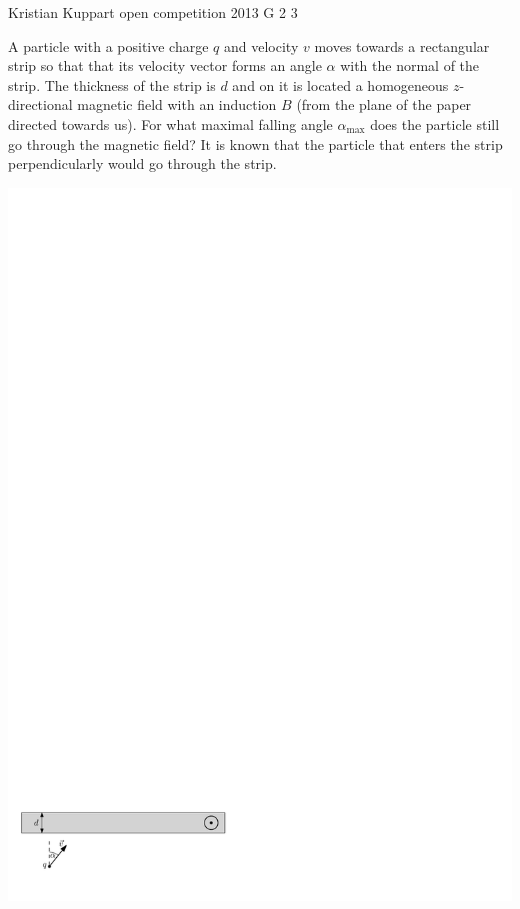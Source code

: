 \documentclass[11pt]{article}
\begin{document}
{Kristian Kuppart} %
{open competition} %
{2013} %
{G 2} %
{3} %
{

\ifEngStatement
A particle with a positive charge $q$ and velocity $v$ moves towards a rectangular strip so that that its velocity vector forms an angle $\alpha$ with the normal of the strip. The thickness of the strip is $d$ and on it is located a homogeneous $z$-directional magnetic field with an induction $B$ (from the plane of the paper directed towards us). For what maximal falling angle $\alpha_{\mathrm{max}}$ does the particle still go through the magnetic field? It is known that the particle that enters the strip perpendicularly would go through the strip.
\begin{center}
\includegraphics[width=\linewidth]{2013-lahg-02-magnetpeegeljoonis_ipe}
\end{center}
\fi
}
\end{document}
